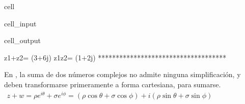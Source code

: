 \documentclass[letterpaper,10pt,english]{jupyterBook}
\begin{document}
\begin{sphinxuseclass}{cell}
\begin{sphinxVerbatimInput}
\begin{sphinxuseclass}{cell_input}
\end{sphinxuseclass}\end{sphinxVerbatimInput}
\begin{sphinxVerbatimOutput}

\begin{sphinxuseclass}{cell_output}
\begin{sphinxVerbatim}[commandchars=\\\{\}]
z1+z2= (3+6j)
z1\PYGZhy{}z2= (\PYGZhy{}1+2j)
************************************
\end{sphinxVerbatim}

\noindent{}

\end{sphinxuseclass}\end{sphinxVerbatimOutput}

\end{sphinxuseclass}
\sphinxAtStartPar
En , la suma de dos números complejos no admite ninguna simplificación, y deben transformarse primeramente a forma cartesiana, para sumarse.
\begin{equation*}
\begin{split}
z + w = \rho e^{i\theta} + \sigma e^{i\phi} = (\rho\cos\theta + \sigma\cos\phi) + i(\rho\sin\theta +  \sigma\sin\phi) \hspace{6cm}
\end{split}
\end{equation*}
\end{document}
